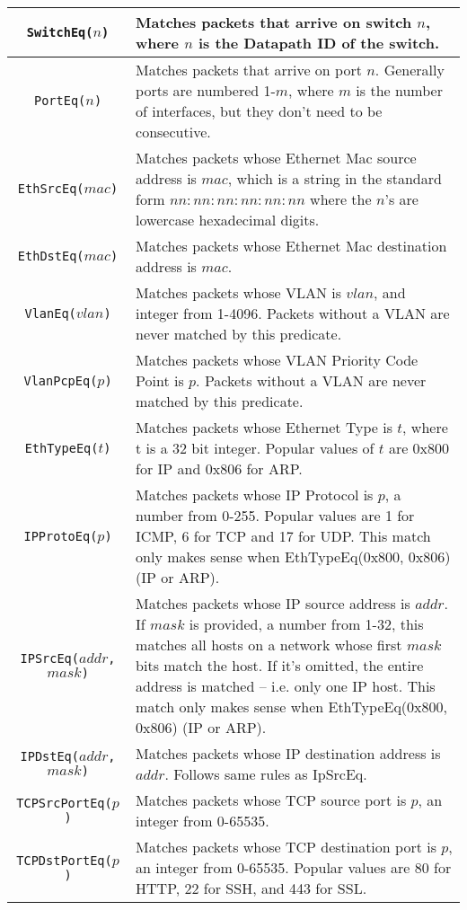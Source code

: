\bigskip
\begin{tabularx}{6in}{|c|X|}
\hline\hline
\texttt{SwitchEq($n$)} & Matches packets that arrive on switch $n$, where $n$ is the Datapath ID of the switch.  
\\ \hline
\texttt{PortEq($n$)} & Matches packets that arrive on port $n$.  Generally ports are numbered 1-$m$, where $m$ is the
number of interfaces, but they don't need to be consecutive.  
\\ \hline
\texttt{EthSrcEq($mac$)} & Matches packets whose Ethernet Mac source address is $mac$, which is a string in the standard form $nn:nn:nn:nn:nn:nn$ where the $n$'s are lowercase hexadecimal digits.
\\ \hline
\texttt{EthDstEq($mac$)} & Matches packets whose Ethernet Mac destination address is $mac$.
\\ \hline
\texttt{VlanEq($vlan$)} & Matches packets whose VLAN is $vlan$, and integer from 1-4096.  Packets without a VLAN are never matched by this predicate.
\\ \hline
\texttt{VlanPcpEq($p$)} & Matches packets whose VLAN Priority Code Point is $p$.  Packets without a VLAN are never matched by this predicate.
\\ \hline
\texttt{EthTypeEq($t$)} & Matches packets whose Ethernet Type is $t$, where t is a 32 bit integer.  Popular values of $t$ are 0x800 for IP and 0x806 for ARP.  
\\ \hline
\texttt{IPProtoEq($p$)} & Matches packets whose IP Protocol is $p$, a number from 0-255.  
Popular values are 1 for ICMP, 6 for TCP and 17 for UDP.  
This match only makes sense when EthTypeEq(0x800, 0x806) (IP or ARP). 
\\ \hline
\texttt{IPSrcEq($addr$, $mask$)} & Matches packets whose IP source address is $addr$.  
If $mask$ is provided, a number from 1-32, this matches all hosts on a network whose first $mask$ bits match the host.
If it's omitted, the entire address is matched -- i.e. only one IP host.  
This match only makes sense when EthTypeEq(0x800, 0x806) (IP or ARP). 
\\ \hline
\texttt{IPDstEq($addr$, $mask$)} & Matches packets whose IP destination address is $addr$.  
Follows same rules as IpSrcEq.
\\ \hline
\texttt{TCPSrcPortEq($p$)} & Matches packets whose TCP source port is $p$, an integer from 0-65535.
\\ \hline
\texttt{TCPDstPortEq($p$)} & Matches packets whose TCP destination port is $p$, an integer from 0-65535.
Popular values are 80 for HTTP, 22 for SSH, and 443 for SSL.  
\\ \hline\hline
\end{tabularx}

